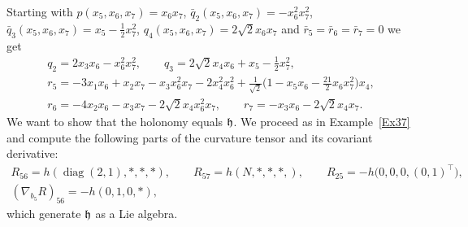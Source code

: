 \documentclass[11pt]{article}
\numberwithin{equation}{section}
\newcommand\fh{{\frak h}}
\newcommand{\diag}{\operatorname{diag}}
\begin{document}
\begin{Example}
Starting with $p(x_5,x_6,x_7)=x_6x_7$, $\bar q_2(x_5,x_6,x_7)=-x_6^2x_7^2$, $\bar q_3(x_5,x_6,x_7)= x_5-\frac 12x_7^2$, $q_4(x_5,x_6,x_7)=2\sqrt2 x_6 x_7$ and $\bar r_5 =\bar r_6=\bar r_7=0$ we get
\begin{gather*}
q_2= 2x_3 x_6-x_6^2x_7^2, \qquad
q_3= 2\sqrt2 x_4 x_6 +x_5- \tfrac12 x_7^2, \\
r_5= -3x_1 x_6+x_2 x_7 -x_3 x_6^2x_7 -2 x_4^2x_6^2 +\tfrac1{\sqrt2}\big(1-x_5x_6-\tfrac{21}2 x_6 x_7^2\big) x_4, \\
r_6= -4x_2 x_6-x_3x_7-2\sqrt2 x_4 x_6^2 x_7, \qquad
r_7= -x_3x_6-2\sqrt2 x_4 x_7 .
\end{gather*}
We want to show that the holonomy equals $\fh$. We proceed as in Example~\ref{Ex37} and compute the following parts of the curvature tensor and its covariant derivative:
\begin{gather*}
R_{56}=h(\diag(2,1), *,*,*),\qquad R_{57}=h(N,*,*,*,),\qquad R_{25}=-h\big(0,0,0,(0,1)^\top\big),\\
(\nabla_{b_5} R)_{56}=-h(0,1,0,*),
\end{gather*}
which generate $\fh$ as a Lie algebra.
\end{Example}
\end{document}
